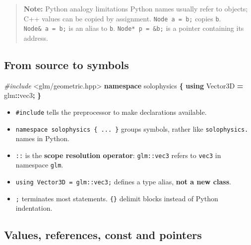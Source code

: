 \documentclass[
  10pt,
  a4paper,
]{article}
\newenvironment{Shaded}{\begin{snugshade}}{\end{snugshade}}
\newcommand{\ImportTok}[1]{#1}
\newcommand{\KeywordTok}[1]{\textcolor[rgb]{0.13,0.29,0.53}{\textbf{#1}}}
\newcommand{\NormalTok}[1]{#1}
\newcommand{\OperatorTok}[1]{\textcolor[rgb]{0.81,0.36,0.00}{\textbf{#1}}}
\newcommand{\PreprocessorTok}[1]{\textcolor[rgb]{0.56,0.35,0.01}{\textit{#1}}}
\providecommand{\tightlist}{%
  \setlength{\itemsep}{0pt}\setlength{\parskip}{0pt}}
\begin{document}
\begin{quote}
\textbf{Note:} Python analogy limitations Python names usually refer to
objects; C++ values can be copied by assignment. \texttt{Node\ a\ =\ b;}
copies \texttt{b}. \texttt{Node\&\ a\ =\ b;} is an alias to \texttt{b}.
\texttt{Node*\ p\ =\ \&b;} is a pointer containing its address.
\end{quote}

\subsection{From source to symbols}\label{from-source-to-symbols}

\begin{Shaded}
\begin{Highlighting}[]
\PreprocessorTok{\#include }\ImportTok{\textless{}glm/geometric.hpp\textgreater{}}
\KeywordTok{namespace}\NormalTok{ solophysics }\OperatorTok{\{}
    \KeywordTok{using}\NormalTok{ Vector3D }\OperatorTok{=}\NormalTok{ glm}\OperatorTok{::}\NormalTok{vec3}\OperatorTok{;}
\OperatorTok{\}}
\end{Highlighting}
\end{Shaded}

\begin{itemize}
\tightlist
\item
  \texttt{\#include} tells the preprocessor to make declarations
  available.
\item
  \texttt{namespace\ solophysics\ \{\ ...\ \}} groups symbols, rather
  like \texttt{solophysics.} names in Python.
\item
  \texttt{::} is the \textbf{scope resolution operator}:
  \texttt{glm::vec3} refers to \texttt{vec3} in namespace \texttt{glm}.
\item
  \texttt{using\ Vector3D\ =\ glm::vec3;} defines a type alias,
  \textbf{not a new class}.
\item
  \texttt{;} terminates most statements. \texttt{\{\}} delimit blocks
  instead of Python indentation.
\end{itemize}

\subsection{Values, references, const and
pointers}\label{values-references-const-and-pointers}
\end{document}
